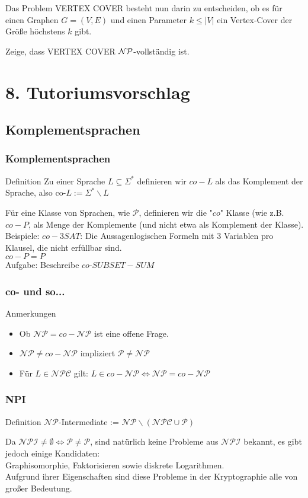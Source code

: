 \documentclass{beamer}
\begin{document}
{\begin{frame}
Das Problem \textsc{VERTEX COVER} besteht nun darin zu entscheiden, ob es
für einen Graphen $G=(V,E)$ und einen Parameter $k \leq |V|$ ein Vertex-Cover
der Größe höchstens $k$ gibt.

Zeige, dass \textsc{VERTEX COVER} $\cal{NP}$-vollständig ist. 
\end{frame}

\section{8. Tutoriumsvorschlag}
\subsection{Komplementsprachen}
\begin{frame}
\frametitle{Komplementsprachen}
\begin{block}{Definition}
Zu einer Sprache $L \subseteq \Sigma^*$ definieren wir $co-L$ als das Komplement der Sprache, also
$\mbox{co-}L := \Sigma^*\backslash L$
\end{block}
Für eine Klasse von Sprachen, wie $\mathcal{P}$, definieren wir die "$co$" Klasse (wie z.B. $co-P$, als Menge der Komplemente (und nicht etwa als Komplement der Klasse).\\[8pt]
Beispiele: $co-3SAT$: Die Aussagenlogischen Formeln mit 3 Variablen pro Klausel, die nicht erfüllbar sind.\\
$co-P = P$\\[8pt]
Aufgabe: Beschreibe $co$-$SUBSET-SUM$
\end{frame}

\begin{frame}
\frametitle{co- und so...}
\begin{block}{Anmerkungen}
\begin{itemize}
\item Ob $\mathcal{NP} = co-\mathcal{NP}$ ist eine offene Frage.
\item $\mathcal{NP} \neq co-\mathcal{NP}$ impliziert $\mathcal{P} \neq \mathcal{NP}$ 
\item Für $L \in \mathcal{NPC}$ gilt: $L \in co-\mathcal{NP} \iff \mathcal{NP} =  co-\mathcal{NP}$
\end{itemize}
\end{block}
\end{frame}

\begin{frame}
\frametitle{NPI}
\begin{block}{Definition}
$\mathcal{NP}$-Intermediate := $\mathcal{NP} \backslash (\mathcal{NPC} \cup \mathcal{P})$
\end{block}
$$ $$ %
Da $\mathcal{NPI} \neq \emptyset \iff \mathcal{P} \neq \mathcal{P}$, sind natürlich keine Probleme aus $\mathcal{NPI}$ bekannt, es gibt jedoch einige Kandidaten:\\
Graphisomorphie, Faktorisieren sowie diskrete Logarithmen.\\
Aufgrund ihrer Eigenschaften sind diese Probleme in der Kryptographie alle von großer Bedeutung.
\end{frame}


}
\end{document}
